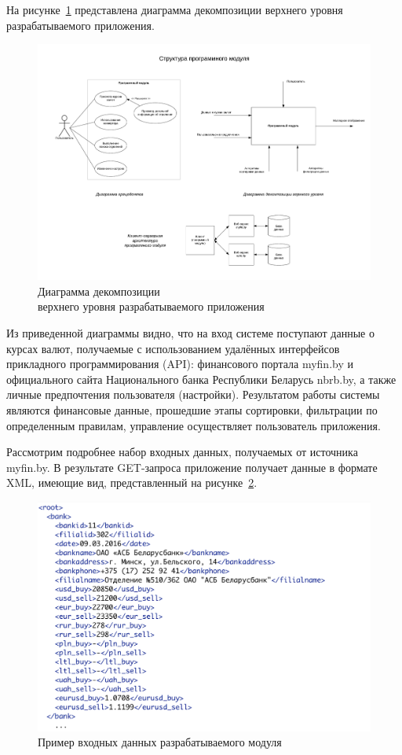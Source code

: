 На рисунке~\ref{fig:idef0} представлена диаграмма декомпозиции
верхнего уровня разрабатываемого приложения.
\begin{figure}[h!]
  \centering
  \includegraphics[width=160mm]{fig/IDEF0}
  \caption{Диаграмма декомпозиции \\ верхнего уровня разрабатываемого приложения}
  \label{fig:idef0}
\end{figure}

Из приведенной диаграммы видно, что на вход системе поступают данные
о курсах валют, получаемые с использованием удалённых интерфейсов
прикладного программирования (API): финансового портала myfin.by и официального
сайта Национального банка Республики Беларусь nbrb.by,
а также личные предпочтения пользователя (настройки).
Результатом работы системы являются финансовые данные, прошедшие этапы сортировки,
фильтрации по определенным правилам, управление осуществляет пользователь приложения.

\pagebreak

Рассмотрим подробнее набор входных данных, получаемых от источника myfin.by.
В результате GET-запроса приложение получает данные в формате XML, имеющие вид,
представленный на рисунке~\ref{fig:myfin_input_xml}.
\begin{figure}[h!]
  \centering
  \includegraphics[width=150mm]{fig/myfin_input_xml}
  \caption{Пример входных данных разрабатываемого модуля}
  \label{fig:myfin_input_xml}
\end{figure}

